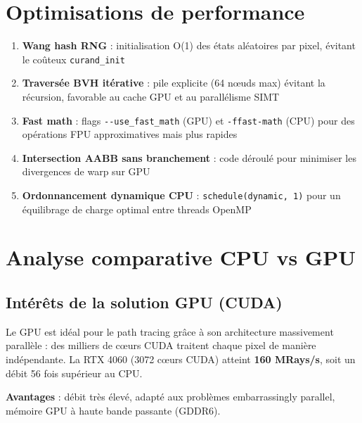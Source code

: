 \documentclass[12pt,a4paper]{article}
\begin{document}
\section{Optimisations de performance}

\begin{enumerate}
    \item \textbf{Wang hash RNG} : initialisation O(1) des états aléatoires par pixel,
    évitant le coûteux \texttt{curand\_init}

    \item \textbf{Traversée BVH itérative} : pile explicite (64 nœuds max) évitant
    la récursion, favorable au cache GPU et au parallélisme SIMT

    \item \textbf{Fast math} : flags \texttt{-{}-use\_fast\_math} (GPU) et \texttt{-ffast-math}
    (CPU) pour des opérations FPU approximatives mais plus rapides

    \item \textbf{Intersection AABB sans branchement} : code déroulé pour minimiser
    les divergences de warp sur GPU

    \item \textbf{Ordonnancement dynamique CPU} : \texttt{schedule(dynamic, 1)} pour
    un équilibrage de charge optimal entre threads OpenMP
\end{enumerate}

\section{Analyse comparative CPU vs GPU}

\subsection{Intérêts de la solution GPU (CUDA)}

Le GPU est idéal pour le path tracing grâce à son architecture massivement parallèle :
des milliers de cœurs CUDA traitent chaque pixel de manière indépendante.
La RTX 4060 (3072 cœurs CUDA) atteint \textbf{160 MRays/s}, soit un débit
56 fois supérieur au CPU.

\textbf{Avantages} : débit très élevé, adapté aux problèmes embarrassingly parallel,
mémoire GPU à haute bande passante (GDDR6).
\end{document}
